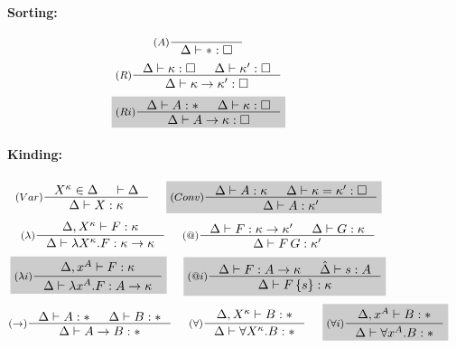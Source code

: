 \begin{figure}
\begin{framed}
\begin{minipage}{.15\textwidth}
\paragraph{Sorting:}
\[ \inference[($A$)]{}{\Delta |- *:\square} \]
\[ \inference[($R$)]{\Delta |- \kappa:\square & \Delta |- \kappa':\square}
                    {\Delta |- \kappa -> \kappa' : \square}
\]\vspace*{.2em}
\[ \newFi{
   \inference[($Ri$)]{\Delta |- A:* & \Delta |- \kappa:\square}
                     {\Delta |- A -> \kappa : \square} }
\]
\end{minipage}

\paragraph{Kinding:}
\[ \inference[($Var$)]{X^\kappa\in\Delta & |- \Delta}
                       {\Delta |- X : \kappa}
 ~~~~ \newFi{
   \inference[($Conv$)]{ \Delta |- A : \kappa
                       & \Delta |- \kappa = \kappa' : \square }
                       {\Delta |- A : \kappa'} }
\]
\[
   \inference[($\lambda$)]{\Delta,X^\kappa |- F : \kappa}
                          {\Delta |- \lambda X^\kappa.F : \kappa->\kappa}
 ~~~~
 \inference[($@$)]{ \Delta |- F : \kappa -> \kappa'
                      & \Delta |- G : \kappa }
                      {\Delta |- F\,G : \kappa'}
\]
\[ \newFi{
   \inference[($\lambda i$)]{\Delta,x^A |- F : \kappa}
                            {\Delta |- \lambda x^A.F : A->\kappa} }
 ~~~~ \newFi{
   \inference[($@i$)]{ \Delta |- F : A -> \kappa
                     & \hat\Delta |- s : A }
                     {\Delta |- F\,\{s\} : \kappa} }
\]
\[ \inference[($->$)]{\Delta |- A : * & \Delta |- B : *}
                     {\Delta |- A -> B : * }
 ~~~~
   \inference[($\forall$)]{\Delta, X^\kappa |- B : *}
                            {\Delta |- \forall X^\kappa . B : *}
 ~~~~ \newFi{
   \inference[($\forall i$)]{\Delta, x^A |- B : *}
                              {\Delta |- \forall x^A . B : *} }
\]


\end{framed}
\end{figure}
